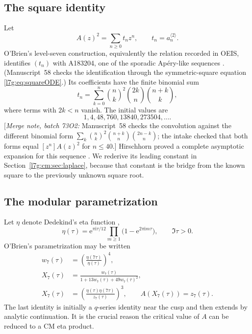 \documentclass[11pt,letterpaper]{article}
\theoremstyle{remark}\newtheorem{remark}[theorem]{Remark}
\newcommand{\ii}{\mathrm i}\newcommand{\ee}{\mathrm e}
\newcommand{\mergenote}[1]{\textup{[}\emph{Merge note, batch 73O2:} #1\textup{]}}
\newcounter{l7gtrsavedeq}
\begin{document}
\subsection{The square identity}\label{l7g:cm:sec:square}
Let
\begin{equation}\label{l7g:cm:eq:Gdef}
 A(z)^2=\sum_{n\ge0}t_nz^n,\qquad t_n=a_n^{\langle2\rangle}.
\end{equation}
O'Brien's level-seven construction, equivalently the relation recorded in
OEIS, identifies $(t_n)$ with A183204, one of the sporadic Ap\'ery-like
sequences \cite{l7g:cooper}. (Manuscript~58 checks the identification
through the symmetric-square equation \eqref{l7g:eq:squareODE}.) Its
coefficients have the finite binomial sum
\begin{equation}\label{l7g:cm:eq:t-sum}
 t_n=\sum_{k=0}^{n}
 \binom{n}{k}^{\!2}\binom{2k}{n}\binom{n+k}{k},
\end{equation}
where terms with $2k<n$ vanish. The initial values are
\[
 1,4,48,760,13840,273504,\ldots.
\]
\mergenote{Manuscript~58 checks the convolution against the different
binomial form
$\sum_k\binom nk^2\binom{n+k}{n}\binom{2n-k}{n}$; the intake checked that
both forms equal $[z^n]A(z)^2$ for $n\le40$.}
Hirschhorn proved a complete asymptotic expansion for this sequence
\cite{l7g:hirschhorn}. We rederive its leading constant in
Section~\ref{l7g:cm:sec:laplace}, because that constant is the bridge from
the known square to the previously unknown square root.

\subsection{The modular parametrization}
Let $\eta$ denote Dedekind's eta function \cite[Ch.~23]{l7g:dlmf},
\begin{equation}\label{l7g:cm:eq:eta}
 \eta(\tau)=\ee^{\pi\ii\tau/12}
 \prod_{m\ge1}\bigl(1-\ee^{2\pi\ii m\tau}\bigr),
 \qquad \Im\tau>0.
\end{equation}
O'Brien's parametrization may be written
\begin{align}
 w_7(\tau)&=\left(\frac{\eta(7\tau)}{\eta(\tau)}\right)^4,
 \label{l7g:cm:eq:w7}\\
 X_7(\tau)&=\frac{w_7(\tau)}{1+13w_7(\tau)+49w_7(\tau)^2},
 \label{l7g:cm:eq:X7}\\
 X_7(\tau)&=
 \left(\frac{\eta(\tau)\eta(7\tau)}{z_7(\tau)}\right)^3,
 \qquad A(X_7(\tau))=z_7(\tau).
 \label{l7g:cm:eq:z7}
\end{align}
The last identity is initially a $q$-series identity near the cusp and
then extends by analytic continuation. It is the crucial reason the
critical value of $A$ can be reduced to a CM eta product.
\end{document}

